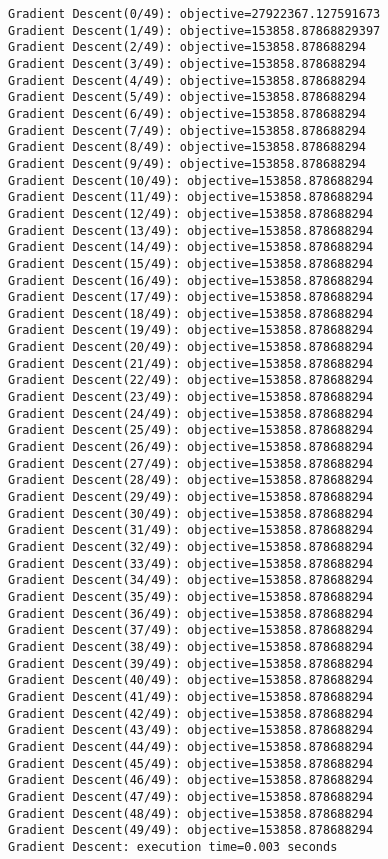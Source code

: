 \documentclass[11pt]{article}
\begin{document}
    \begin{Verbatim}[commandchars=\\\{\}]
Gradient Descent(0/49): objective=27922367.127591673
Gradient Descent(1/49): objective=153858.87868829397
Gradient Descent(2/49): objective=153858.878688294
Gradient Descent(3/49): objective=153858.878688294
Gradient Descent(4/49): objective=153858.878688294
Gradient Descent(5/49): objective=153858.878688294
Gradient Descent(6/49): objective=153858.878688294
Gradient Descent(7/49): objective=153858.878688294
Gradient Descent(8/49): objective=153858.878688294
Gradient Descent(9/49): objective=153858.878688294
Gradient Descent(10/49): objective=153858.878688294
Gradient Descent(11/49): objective=153858.878688294
Gradient Descent(12/49): objective=153858.878688294
Gradient Descent(13/49): objective=153858.878688294
Gradient Descent(14/49): objective=153858.878688294
Gradient Descent(15/49): objective=153858.878688294
Gradient Descent(16/49): objective=153858.878688294
Gradient Descent(17/49): objective=153858.878688294
Gradient Descent(18/49): objective=153858.878688294
Gradient Descent(19/49): objective=153858.878688294
Gradient Descent(20/49): objective=153858.878688294
Gradient Descent(21/49): objective=153858.878688294
Gradient Descent(22/49): objective=153858.878688294
Gradient Descent(23/49): objective=153858.878688294
Gradient Descent(24/49): objective=153858.878688294
Gradient Descent(25/49): objective=153858.878688294
Gradient Descent(26/49): objective=153858.878688294
Gradient Descent(27/49): objective=153858.878688294
Gradient Descent(28/49): objective=153858.878688294
Gradient Descent(29/49): objective=153858.878688294
Gradient Descent(30/49): objective=153858.878688294
Gradient Descent(31/49): objective=153858.878688294
Gradient Descent(32/49): objective=153858.878688294
Gradient Descent(33/49): objective=153858.878688294
Gradient Descent(34/49): objective=153858.878688294
Gradient Descent(35/49): objective=153858.878688294
Gradient Descent(36/49): objective=153858.878688294
Gradient Descent(37/49): objective=153858.878688294
Gradient Descent(38/49): objective=153858.878688294
Gradient Descent(39/49): objective=153858.878688294
Gradient Descent(40/49): objective=153858.878688294
Gradient Descent(41/49): objective=153858.878688294
Gradient Descent(42/49): objective=153858.878688294
Gradient Descent(43/49): objective=153858.878688294
Gradient Descent(44/49): objective=153858.878688294
Gradient Descent(45/49): objective=153858.878688294
Gradient Descent(46/49): objective=153858.878688294
Gradient Descent(47/49): objective=153858.878688294
Gradient Descent(48/49): objective=153858.878688294
Gradient Descent(49/49): objective=153858.878688294
Gradient Descent: execution time=0.003 seconds
    \end{Verbatim}
\end{document}
